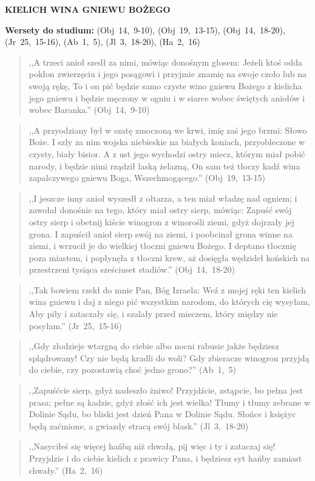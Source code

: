 \documentclass[10pt,a4paper,oneside]{article}
\begin{document}
\centerline{\textbf{\MakeUppercase{Kielich wina gniewu Bożego}}}
\begin{center}
\textbf{Wersety do studium:} (Obj~14,~9-10), (Obj~19,~13-15), (Obj~14,~18-20), (Jr~25,~15-16), (Ab~1,~5), (Jl~3,~18-20), (Ha~2,~16)
\end{center}
\begin{quote}
,,A trzeci anioł szedł za nimi, mówiąc donośnym głosem: Jeżeli ktoś odda pokłon zwierzęciu i jego posągowi i przyjmie znamię na swoje czoło lub na swoją rękę, To i on pić będzie samo czyste wino gniewu Bożego z kielicha jego gniewu i będzie męczony w ogniu i w siarce wobec świętych aniołów i wobec Baranka.'' (Obj~14,~9-10)
\end{quote}
\begin{quote}
,,A przyodziany był w szatę zmoczoną we krwi, imię zaś jego brzmi: Słowo Boże. I szły za nim wojska niebieskie na białych koniach, przyobleczone w czysty, biały bisior. A z ust jego wychodzi ostry miecz, którym miał pobić narody, i będzie nimi rządził laską żelazną, On sam też tłoczy kadź wina zapalczywego gniewu Boga, Wszechmogącego.'' (Obj~19,~13-15)
\end{quote}
\begin{quote}
,,I jeszcze inny anioł wyszedł z ołtarza, a ten miał władzę nad ogniem; i zawołał donośnie na tego, który miał ostry sierp, mówiąc: Zapuść swój ostry sierp i obetnij kiście winogron z winorośli ziemi, gdyż dojrzały jej grona. I zapuścił anioł sierp swój na ziemi, i poobcinał grona winne na ziemi, i wrzucił je do wielkiej tłoczni gniewu Bożego. I deptano tłocznię poza miastem, i popłynęła z tłoczni krew, aż dosięgła wędzideł końskich na przestrzeni tysiąca sześciuset stadiów.'' (Obj~14,~18-20)
\end{quote}
\begin{quote}
,,Tak bowiem rzekł do mnie Pan, Bóg Izraela: Weź z mojej ręki ten kielich wina gniewu i daj z niego pić wszystkim narodom, do których cię wysyłam, Aby piły i zataczały się, i szalały przed mieczem, który między nie posyłam.'' (Jr~25,~15-16)
\end{quote}
\begin{quote}
,,Gdy złodzieje wtargną do ciebie albo nocni rabusie jakże będziesz splądrowany! Czy nie będą kradli do woli? Gdy zbieracze winogron przyjdą do ciebie, czy pozostawią choć jedno grono?'' (Ab~1,~5)
\end{quote}
\begin{quote}
,,Zapuśćcie sierp, gdyż nadeszło żniwo! Przyjdźcie, zstąpcie, bo pełna jest prasa; pełne są kadzie, gdyż złość ich jest wielka! Tłumy i tłumy zebrane w Dolinie Sądu, bo bliski jest dzień Pana w Dolinie Sądu. Słońce i księżyc będą zaćmione, a gwiazdy stracą swój blask.'' (Jl~3,~18-20)
\end{quote}
\begin{quote}
,,Nasyciłeś się więcej hańbą niż chwałą, pij więc i ty i zataczaj się! Przyjdzie i do ciebie kielich z prawicy Pana, i będziesz syt hańby zamiast chwały.'' (Ha~2,~16)
\end{quote}
\end{document}

